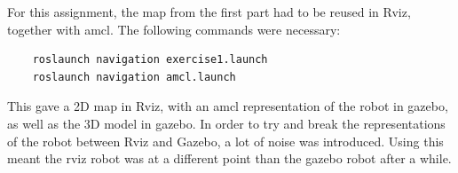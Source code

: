 
For this assignment, the map from the first part had to be reused in Rviz, together with amcl. The following commands were necessary:

\begin{lstlisting}
	roslaunch navigation exercise1.launch
	roslaunch navigation amcl.launch
\end{lstlisting}

This gave a 2D map in Rviz, with an amcl representation of the robot in gazebo, as well as the 3D model in gazebo. In order to try and break the representations of the robot between Rviz and Gazebo, a lot of noise was introduced. Using this meant the rviz robot was at a different point than the gazebo robot after a while.



